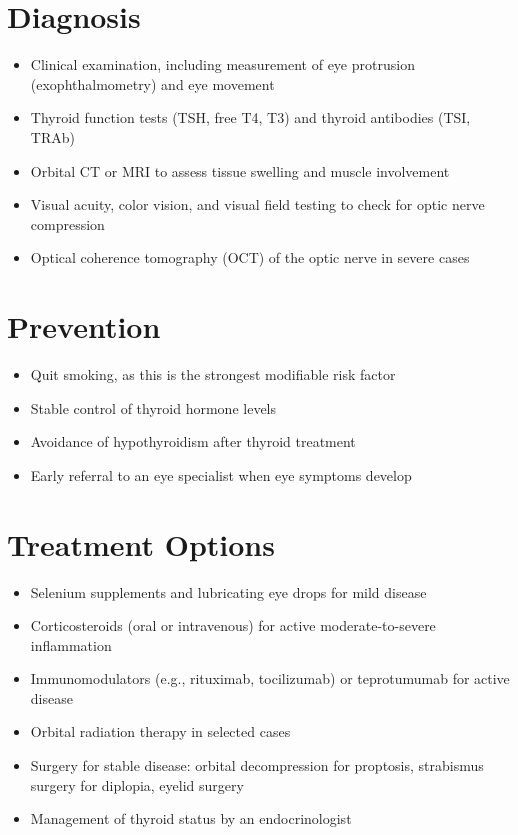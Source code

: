 \section{Diagnosis}
\begin{itemize}[noitemsep]
  \item Clinical examination, including measurement of eye protrusion (exophthalmometry) and eye movement
  \item Thyroid function tests (TSH, free T4, T3) and thyroid antibodies (TSI, TRAb)
  \item Orbital CT or MRI to assess tissue swelling and muscle involvement
  \item Visual acuity, color vision, and visual field testing to check for optic nerve compression
  \item Optical coherence tomography (OCT) of the optic nerve in severe cases
\end{itemize}
\section{Prevention}
\begin{itemize}[noitemsep]
  \item Quit smoking, as this is the strongest modifiable risk factor
  \item Stable control of thyroid hormone levels
  \item Avoidance of hypothyroidism after thyroid treatment
  \item Early referral to an eye specialist when eye symptoms develop
\end{itemize}
\section{Treatment Options}
\begin{itemize}[noitemsep]
  \item Selenium supplements and lubricating eye drops for mild disease
  \item Corticosteroids (oral or intravenous) for active moderate-to-severe inflammation
  \item Immunomodulators (e.g., rituximab, tocilizumab) or teprotumumab for active disease
  \item Orbital radiation therapy in selected cases
  \item Surgery for stable disease: orbital decompression for proptosis, strabismus surgery for diplopia, eyelid surgery
  \item Management of thyroid status by an endocrinologist
\end{itemize}
